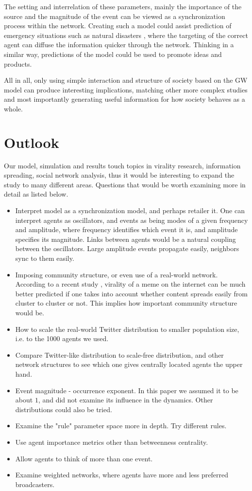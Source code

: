 \documentclass [12pt,a4paper,twoside]{article}
\begin{document}
The setting and interrelation of these parameters, mainly the importance of the source and the magnitude of the event can be viewed as a synchronization process within the network. Creating such a model could assist prediction of emergency situations such as natural disasters \cite{rand2015}, where the targeting of the correct agent can diffuse the information quicker through the network. Thinking in a similar way, predictions of the model could be used to promote ideas and products. 

All in all, only using simple interaction and structure of society based on the GW model can produce interesting implications, matching other more complex studies and most importantly generating useful information for how society behaves as a whole. 

\section{Outlook}

Our model, simulation and results touch topics in virality research, information spreading, social network analysis, thus it would be interesting to expand the study to many different areas. Questions that would be worth examining more in detail as listed below.

\begin{itemize}
\item Interpret model as a synchronization model, and perhaps retailer it. One can interpret agents as oscillators, and events as being modes of a given frequency and amplitude, where frequency identifies which event it is, and amplitude specifies its magnitude. Links between agents would be a natural coupling between the oscillators. Large amplitude events propagate easily, neighbors sync to them easily.
\item Imposing community structure, or even use of a real-world network. According to a recent study \cite{Virality-community-important}, virality of a meme on the internet can be much better predicted if one takes into account whether content spreads easily from cluster to cluster or not. This implies how important community structure would be.
\item How to scale the real-world Twitter distribution to smaller population size, i.e. to the 1000 agents we used.
\item Compare Twitter-like distribution to scale-free distribution, and other network structures to see which one gives centrally located agents the upper hand.
\item Event magnitude - occurrence exponent. In this paper we assumed it to be about $1$, and did not examine its influence in the dynamics. Other distributions could also be tried.
\item Examine the "rule" parameter space more in depth. Try different rules.
\item Use agent importance metrics other than betweenness centrality.
\item Allow agents to think of more than one event.
\item Examine weighted networks, where agents have more and less preferred broadcasters.
\end{itemize}


\small \setlength{\bibsep}{1pt}

%

\end{document}
